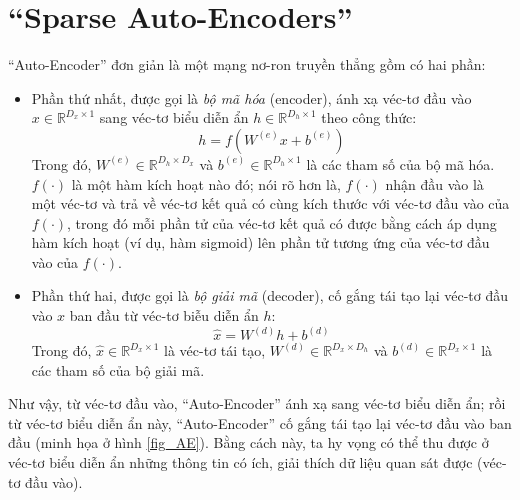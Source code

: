 \section{``Sparse Auto-Encoders''}
``Auto-Encoder'' đơn giản là một mạng nơ-ron truyền thẳng gồm có hai phần: 
\begin{itemize}
	\item Phần thứ nhất, được gọi là \emph{bộ mã hóa} (encoder), ánh xạ véc-tơ đầu vào $x \in \mathbb{R}^{D_x \times 1}$ sang véc-tơ biểu diễn ẩn $h \in \mathbb{R}^{D_h \times 1}$ theo công thức: 
	\begin{equation}
		h=f(W^{(e)}x + b^{(e)})
	\end{equation}
	Trong đó, $W^{(e)} \in \mathbb{R}^{D_h \times D_x}$ và $b^{(e)} \in \mathbb{R}^{D_h \times 1}$ là các tham số của bộ mã hóa. $f(\cdot)$ là một hàm kích hoạt nào đó; nói rõ hơn là, $f(\cdot)$ nhận đầu vào là một véc-tơ và trả về véc-tơ kết quả có cùng kích thước với véc-tơ đầu vào của $f(\cdot)$, trong đó mỗi phần tử của véc-tơ kết quả có được bằng cách áp dụng hàm kích hoạt (ví dụ, hàm sigmoid) lên phần tử tương ứng của véc-tơ đầu vào của $f(\cdot)$.
	\item Phần thứ hai, được gọi là \emph{bộ giải mã} (decoder), cố gắng tái tạo lại véc-tơ đầu vào $x$ ban đầu từ véc-tơ biễu diễn ẩn $h$:
	\begin{equation}
		\hat{x} = W^{(d)}h + b^{(d)}
	\end{equation}
	Trong đó, $\hat{x} \in \mathbb{R}^{D_x \times 1}$ là véc-tơ tái tạo, $W^{(d)} \in \mathbb{R}^{D_x \times D_h}$ và $b^{(d)} \in \mathbb{R}^{D_x \times 1}$ là các tham số của bộ giải mã.
\end{itemize}

Như vậy, từ véc-tơ đầu vào, ``Auto-Encoder'' ánh xạ sang véc-tơ biểu diễn ẩn; rồi từ véc-tơ biểu diễn ẩn này, ``Auto-Encoder'' cố gắng tái tạo lại véc-tơ đầu vào ban đầu (minh họa ở hình \ref{fig_AE}). Bằng cách này, ta hy vọng có thể thu được ở véc-tơ biểu diễn ẩn những thông tin có ích, giải thích dữ liệu quan sát được (véc-tơ đầu vào).

